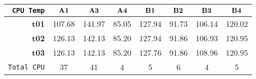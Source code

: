 \begin{tabular}{r|ccccccc}\cline{2-8}
\tt CPU Temp&$\bf A1$&$\bf A3$&$\bf A4$&$\bf B1$&$\bf B2$&$\bf B3$&$\bf B4$\\\hline
\bf t01& 107.68& 141.97& 85.05& 127.94& 91.73& 106.14& 120.02\\
\bf t02& 126.13& 142.13& 85.20& 127.94& 91.86& 106.93& 120.95\\
\bf t03& 126.13& 142.13& 85.20& 127.76& 91.86& 108.96& 120.95\\
\hline
\tt Total CPU& 37& 41& 4& 5& 6& 4& 5\\
\end{tabular}
